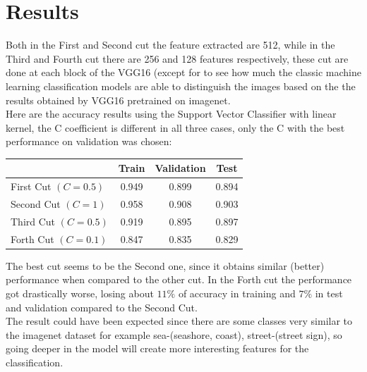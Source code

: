 \documentclass[11pt]{article}
\begin{document}
\section*{Results}
Both in the First and Second cut the feature extracted are 512, while in the Third and Fourth cut there are 256 and 128 features respectively, these cut are done at each block of the VGG16 (except for  to see how much the classic machine learning classification models are able to distinguish the images based on the the results obtained by VGG16 pretrained on imagenet.\\
Here are the accuracy results using the Support Vector Classifier with linear kernel, the C coefficient is different in all three cases, only the C with the best performance on validation was chosen:
\begin{center}
  \begin{tabular}{|l|c|c|c|}
    \hline
    & Train & Validation & Test\\
    \hline
    First Cut $(C=0.5)$ & 0.949 & 0.899 & 0.894\\
    \hline
    Second Cut $(C=1)$ & 0.958 & 0.908 & 0.903\\
    \hline
    Third Cut $(C=0.5)$ & 0.919 & 0.895 & 0.897\\
    \hline
    Forth Cut $(C=0.1)$ & 0.847 & 0.835 & 0.829\\
    \hline
  \end{tabular}
\end{center}
The best cut seems to be the Second one, since it obtains similar (better) performance when compared to the other cut. In the Forth cut the performance got drastically worse, losing about $11\%$ of accuracy in training and $7\%$ in test and validation compared to the Second Cut.\\
The result could have been expected since there are some classes very similar to the imagenet dataset for example sea-(seashore, coast), street-(street sign), so going deeper in the model will create more interesting features for the classification.
\end{document}
